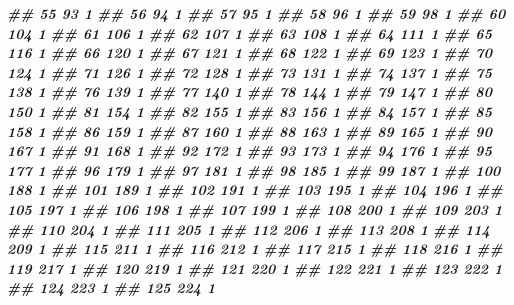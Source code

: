 \documentclass[
]{book}
\newenvironment{Shaded}{\begin{snugshade}}{\end{snugshade}}
\newcommand{\DocumentationTok}[1]{\textcolor[rgb]{0.56,0.35,0.01}{\textbf{\textit{#1}}}}
\theoremstyle{definition}
\theoremstyle{definition}
\theoremstyle{definition}
\theoremstyle{definition}
\theoremstyle{remark}
\begin{document}
\begin{Shaded}
\begin{Highlighting}[]
\DocumentationTok{\#\# 55      93 1}
\DocumentationTok{\#\# 56      94 1}
\DocumentationTok{\#\# 57      95 1}
\DocumentationTok{\#\# 58      96 1}
\DocumentationTok{\#\# 59      98 1}
\DocumentationTok{\#\# 60     104 1}
\DocumentationTok{\#\# 61     106 1}
\DocumentationTok{\#\# 62     107 1}
\DocumentationTok{\#\# 63     108 1}
\DocumentationTok{\#\# 64     111 1}
\DocumentationTok{\#\# 65     116 1}
\DocumentationTok{\#\# 66     120 1}
\DocumentationTok{\#\# 67     121 1}
\DocumentationTok{\#\# 68     122 1}
\DocumentationTok{\#\# 69     123 1}
\DocumentationTok{\#\# 70     124 1}
\DocumentationTok{\#\# 71     126 1}
\DocumentationTok{\#\# 72     128 1}
\DocumentationTok{\#\# 73     131 1}
\DocumentationTok{\#\# 74     137 1}
\DocumentationTok{\#\# 75     138 1}
\DocumentationTok{\#\# 76     139 1}
\DocumentationTok{\#\# 77     140 1}
\DocumentationTok{\#\# 78     144 1}
\DocumentationTok{\#\# 79     147 1}
\DocumentationTok{\#\# 80     150 1}
\DocumentationTok{\#\# 81     154 1}
\DocumentationTok{\#\# 82     155 1}
\DocumentationTok{\#\# 83     156 1}
\DocumentationTok{\#\# 84     157 1}
\DocumentationTok{\#\# 85     158 1}
\DocumentationTok{\#\# 86     159 1}
\DocumentationTok{\#\# 87     160 1}
\DocumentationTok{\#\# 88     163 1}
\DocumentationTok{\#\# 89     165 1}
\DocumentationTok{\#\# 90     167 1}
\DocumentationTok{\#\# 91     168 1}
\DocumentationTok{\#\# 92     172 1}
\DocumentationTok{\#\# 93     173 1}
\DocumentationTok{\#\# 94     176 1}
\DocumentationTok{\#\# 95     177 1}
\DocumentationTok{\#\# 96     179 1}
\DocumentationTok{\#\# 97     181 1}
\DocumentationTok{\#\# 98     185 1}
\DocumentationTok{\#\# 99     187 1}
\DocumentationTok{\#\# 100    188 1}
\DocumentationTok{\#\# 101    189 1}
\DocumentationTok{\#\# 102    191 1}
\DocumentationTok{\#\# 103    195 1}
\DocumentationTok{\#\# 104    196 1}
\DocumentationTok{\#\# 105    197 1}
\DocumentationTok{\#\# 106    198 1}
\DocumentationTok{\#\# 107    199 1}
\DocumentationTok{\#\# 108    200 1}
\DocumentationTok{\#\# 109    203 1}
\DocumentationTok{\#\# 110    204 1}
\DocumentationTok{\#\# 111    205 1}
\DocumentationTok{\#\# 112    206 1}
\DocumentationTok{\#\# 113    208 1}
\DocumentationTok{\#\# 114    209 1}
\DocumentationTok{\#\# 115    211 1}
\DocumentationTok{\#\# 116    212 1}
\DocumentationTok{\#\# 117    215 1}
\DocumentationTok{\#\# 118    216 1}
\DocumentationTok{\#\# 119    217 1}
\DocumentationTok{\#\# 120    219 1}
\DocumentationTok{\#\# 121    220 1}
\DocumentationTok{\#\# 122    221 1}
\DocumentationTok{\#\# 123    222 1}
\DocumentationTok{\#\# 124    223 1}
\DocumentationTok{\#\# 125    224 1}

\end{Highlighting}
\end{Shaded}
\end{document}
